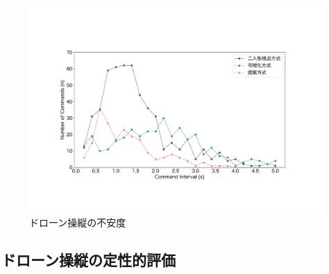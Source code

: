 \documentclass[a4paper,11pt]{ujreport}
\begin{document}
\begin{figure}[!b]
  \centering
  \includegraphics[width=0.7\linewidth]{img/05_command.pdf}
  \caption{ドローン操縦の不安度}
  \label{fig:05_command}
\end{figure}

\subsection{ドローン操縦の定性的評価}
\label{sec:QualitativePerformance}
\end{document}
